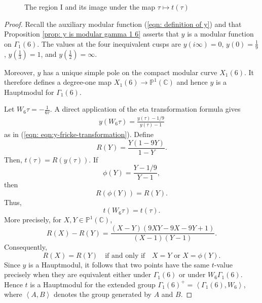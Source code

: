 \documentclass[12pt, a4paper]{amsart}
\theoremstyle{definition}
\numberwithin{theorem}{section}
\begin{document}
\begin{figure}[H]

    \caption{The region $\mathrm{I}$ and its image under the map $\tau\mapsto t\left(\tau\right)$}
    \label{fig:region-I-under-t}
\end{figure}
\begin{proof}
Recall the auxiliary modular function (\ref{eqn: definition of y}) and that Proposition \ref{prop: y is modular gamma 1 6} asserts that \(y\) is a modular function on \(\Gamma_1\left(6\right)\). The values at the four inequivalent cusps are $y\left(i\infty\right)=0$, $y\left(0\right)=\frac{1}{9}$, $y\left(\frac{1}{3}\right)=1$, and $y\left(\frac{1}{2}\right)=\infty$. 

Moreover, \(y\) has a unique simple pole on the compact modular curve \(X_1\left(6\right)\). It therefore defines a degree-one map $X_1\left(6\right)\rightarrow\mathbb{P}^1\left(\mathbb{C}\right)$ and hence \(y\) is a Hauptmodul for \(\Gamma_1\left(6\right)\).

Let $W_6\tau=-\frac{1}{6\tau}$. A direct application of the eta transformation formula gives
\begin{align}\label{eqn: y fricke 2}
y\left(W_6\tau\right)=\frac{y\left(\tau\right)-1/9}{y\left(\tau\right)-1}
\end{align}
as in (\ref{eqn: eqn:y-fricke-transformation}). Define
\[R\left(Y\right)=\frac{Y\left(1-9Y\right)}{1-Y}.\]
Then, $t\left(\tau\right)=R\left(y\left(\tau\right)\right)$. If
\[\phi\left(Y\right)=\frac{Y-1/9}{Y-1},
\]
then
\[R\left(\phi\left(Y\right)\right)=R\left(Y\right).\]
Thus,
\[t\left(W_6\tau\right)=t\left(\tau\right).\]
More precisely, for \(X,Y\in\mathbb{P}^1\left(\mathbb{C}\right)\),
\[R\left(X\right)-R\left(Y\right)=\frac{\left(X-Y\right)\left(9XY-9X-9Y+1\right)}{\left(X-1\right)\left(Y-1\right)}.\]
Consequently,
\[R\left(X\right)=R\left(Y\right)\quad\text{if and only if}\quad X=Y\text{ or }X=\phi\left(Y\right).
\]
Since \(y\) is a Hauptmodul, it follows that two points have the same \(t\)-value precisely when they are equivalent either under \(\Gamma_1\left(6\right)\) or under \(W_6\Gamma_1\left(6\right)\). Hence \(t\) is a Hauptmodul for the extended group $\Gamma_1\left(6\right)^{+}=\left\langle\Gamma_1\left(6\right),W_6\right\rangle$, where $\left\langle A,B\right\rangle$ denotes the group generated by $A$ and $B$. 


\end{proof}
\end{document}
